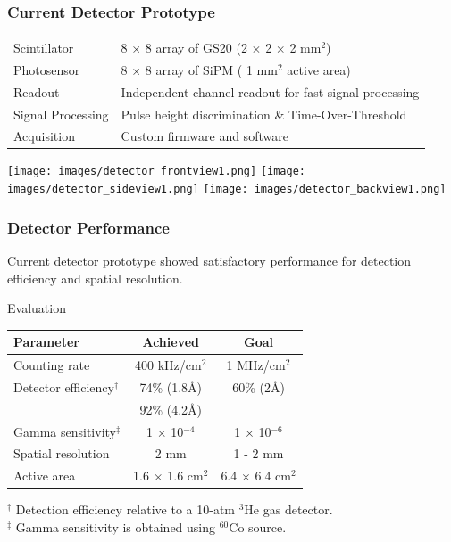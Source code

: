 \documentclass[xcolor=x11names, compress, handout]{beamer}
\renewcommand{\(}{\begin{columns}}
\renewcommand{\)}{\end{columns}}
\newcommand{\<}[1]{\begin{column}{#1}}
\renewcommand{\>}{\end{column}}
\begin{document}
\begin{frame}
  \frametitle{Current Detector Prototype}
  \begin{tabular}{l l}
  Scintillator & 8 $\times$ 8 array of GS20 (2 $\times$ 2 $\times$ 2 mm$^2$)  \\
  Photosensor & 8 $\times$ 8 array of SiPM ( 1 mm$^2$ active area) \\
  Readout & Independent channel readout for fast signal processing \\
  Signal Processing & Pulse height discrimination \& Time-Over-Threshold \\
  Acquisition & Custom firmware and software \\
  \end{tabular}

  \begin{center}
  \texttt{[image: images/detector\_frontview1.png]}
  \texttt{[image: images/detector\_sideview1.png]}
  \texttt{[image: images/detector\_backview1.png]}
  \end{center}
\end{frame}

\begin{frame}[c]
  \frametitle{Detector Performance }
  Current detector prototype showed satisfactory performance for detection efficiency and spatial resolution.  \\

  \begin{block}{Evaluation}
  \centering
  \begin{tabular}{l c c }
  \hline
  Parameter & Achieved & Goal \\
  \hline
  Counting rate & 400 kHz/cm$^2$ & 1 MHz/cm$^2$\\
  Detector efficiency$^\dagger$ & \textcolor{dgreen}{74\% (1.8\AA)} & 60\% (2\AA) \\
   & \textcolor{dgreen}{92\% (4.2\AA)} & \\
  Gamma sensitivity$^\ddagger$ & 1 $\times$ 10$^{-4}$ & 1 $\times$ 10$^{-6}$\\
  Spatial resolution & \textcolor{dgreen}{2 mm} & 1 - 2 mm \\
  Active area & 1.6 $\times$ 1.6 cm$^2$ & 6.4 $\times$ 6.4 cm$^2$\\
  \hline
  \end{tabular}

  \scriptsize $^\dagger$ Detection efficiency relative to a 10-atm $^3$He gas detector. \\
  $^\ddagger$ Gamma sensitivity is obtained using $^{60}$Co source.
    \end{block}



\end{frame}
\end{document}
